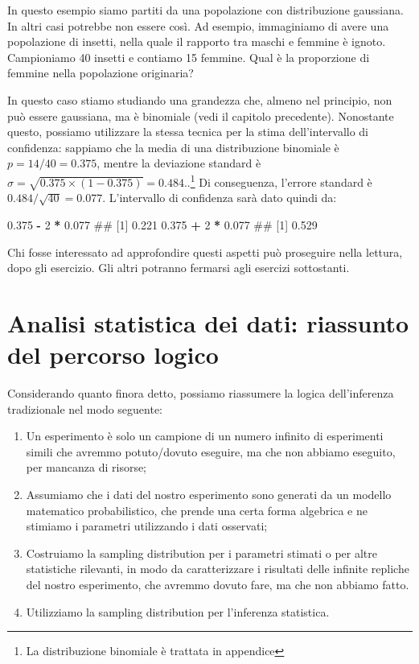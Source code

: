 \documentclass[a4paper,12pt,oneside]{book}
\providecommand{\tightlist}{%
  \setlength{\itemsep}{0pt}\setlength{\parskip}{0pt}}
\newenvironment{Shaded}{\begin{snugshade}}{\end{snugshade}}
\newcommand{\DecValTok}[1]{\textcolor[rgb]{0.00,0.00,0.81}{#1}}
\newcommand{\FloatTok}[1]{\textcolor[rgb]{0.00,0.00,0.81}{#1}}
\newcommand{\StringTok}[1]{\textcolor[rgb]{0.31,0.60,0.02}{#1}}
\newcommand{\OperatorTok}[1]{\textcolor[rgb]{0.81,0.36,0.00}{\textbf{#1}}}
\newcommand{\NormalTok}[1]{#1}
\theoremstyle{definition}
\theoremstyle{definition}
\theoremstyle{definition}
\theoremstyle{remark}
\begin{document}
In questo esempio siamo partiti da una popolazione con distribuzione
gaussiana. In altri casi potrebbe non essere così. Ad esempio,
immaginiamo di avere una popolazione di insetti, nella quale il rapporto
tra maschi e femmine è ignoto. Campioniamo 40 insetti e contiamo 15
femmine. Qual è la proporzione di femmine nella popolazione originaria?

In questo caso stiamo studiando una grandezza che, almeno nel principio,
non può essere gaussiana, ma è binomiale (vedi il capitolo precedente).
Nonostante questo, possiamo utilizzare la stessa tecnica per la stima
dell'intervallo di confidenza: sappiamo che la media di una
distribuzione binomiale è \(p = 14/40 = 0.375\), mentre la deviazione
standard è
\(\sigma = \sqrt{0.375 \times (1 - 0.375)} = 0.484\)..\footnote{La
  distribuzione binomiale è trattata in appendice} Di conseguenza,
l'errore standard è \(0.484 / \sqrt{40} = 0.077\). L'intervallo di
confidenza sarà dato quindi da:

\begin{Shaded}
\begin{Highlighting}[]
\FloatTok{0.375} \OperatorTok{-}\StringTok{ }\DecValTok{2} \OperatorTok{*}\StringTok{ }\FloatTok{0.077}
\NormalTok{## [1] 0.221}
\FloatTok{0.375} \OperatorTok{+}\StringTok{ }\DecValTok{2} \OperatorTok{*}\StringTok{ }\FloatTok{0.077}
\NormalTok{## [1] 0.529}
\end{Highlighting}
\end{Shaded}

Chi fosse interessato ad approfondire questi aspetti può proseguire
nella lettura, dopo gli esercizio. Gli altri potranno fermarsi agli
esercizi sottostanti.

\section{Analisi statistica dei dati: riassunto del percorso
logico}\label{analisi-statistica-dei-dati-riassunto-del-percorso-logico}

Considerando quanto finora detto, possiamo riassumere la logica
dell'inferenza tradizionale nel modo seguente:

\begin{enumerate}
\def\labelenumi{\arabic{enumi}.}
\tightlist
\item
  Un esperimento è solo un campione di un numero infinito di esperimenti
  simili che avremmo potuto/dovuto eseguire, ma che non abbiamo
  eseguito, per mancanza di risorse;
\item
  Assumiamo che i dati del nostro esperimento sono generati da un
  modello matematico probabilistico, che prende una certa forma
  algebrica e ne stimiamo i parametri utilizzando i dati osservati;
\item
  Costruiamo la sampling distribution per i parametri stimati o per
  altre statistiche rilevanti, in modo da caratterizzare i risultati
  delle infinite repliche del nostro esperimento, che avremmo dovuto
  fare, ma che non abbiamo fatto.
\item
  Utilizziamo la sampling distribution per l'inferenza statistica.
\end{enumerate}
\end{document}
